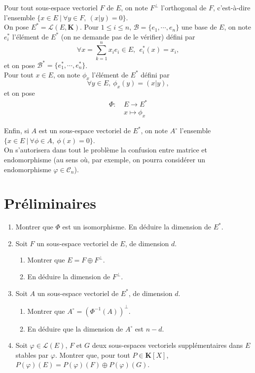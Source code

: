 \documentclass[a4paper,11pt]{article}
\newcommand{\K}{\mathbf{K}}
\newcommand{\B}{\mathcal{B}}
\newcommand{\CC}{\mathcal{C}}
\renewcommand{\L}{\mathcal{L}}
\begin{document}
Pour tout sous-espace vectoriel $F$ de $E$, on note $F^\perp$ l'orthogonal de $F$, c'est-à-dire l'ensemble $\{x\in E\ \vert\ \forall y\in F,\ (x\vert y)=0\}$.\\

On pose $E^*=\L(E,\K)$. Pour $1\leq i\leq n$, $\B=\{e_1,\cdots, e_n\}$ une base de $E$, on note $e^*_i$ l'élément de $E^*$ (on ne demande pas de le vérifier) défini par
\[\forall x=\displaystyle\sum_{k=1}^nx_ie_i\in E,\ \ e^*_i(x)=x_i,\]
et on pose $\B^*=\{e^*_1,\cdots, e^*_n\}$.\\

Pour tout $x\in E$, on note $\phi_x$ l'élément de $E^*$ défini par
\[\forall y\in E,\ \phi_x(y)=(x\vert y),\]
et on pose 
\begin{align*}
\Phi:\ &E\rightarrow E^*\\
&x\mapsto\phi_x
\end{align*}

Enfin, si $A$ est un sous-espace vectoriel de $E^*$, on note $A^\circ$ l'ensemble $\{x\in E\ \vert\ \forall\phi\in A,\ \phi(x)=0\}$.\\

On s'autorisera dans tout le problème la confusion entre matrice et endomorphisme (au sens où, par exemple, on pourra considérer un endomorphisme $\varphi\in\CC_n$).\\

\section{Préliminaires}
\begin{enumerate}
\item Montrer que $\Phi$ est un isomorphisme. En déduire la dimension de $E^*$.
\item Soit $F$ un sous-espace vectoriel de $E$, de dimension $d$.
\begin{enumerate}
\item Montrer que $E=F\oplus F^\perp$.
\item En déduire la dimension de $F^\perp$.
\end{enumerate}
\item Soit $A$ un sous-espace vectoriel de $E^*$, de dimension $d$.
\begin{enumerate}
\item Montrer que $A^\circ=\left(\Phi^{-1}(A)\right)^\perp$.
\item En déduire que la dimension de $A^\circ$ est $n-d$.
\end{enumerate}
\item Soit $\varphi\in\L(E)$, $F$ et $G$ deux sous-espaces vectoriels supplémentaires dans $E$ stables par $\varphi$. Montrer que, pour tout $P\in\K[X]$, $P(\varphi)(E)=P(\varphi)(F)\oplus P(\varphi)(G)$.
\end{enumerate}
\end{document}
